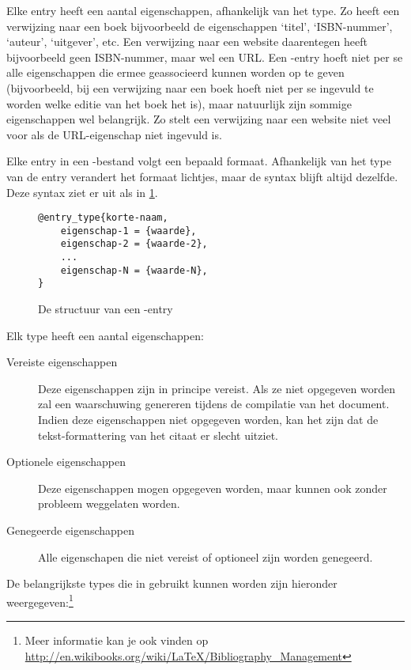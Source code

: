 \documentclass[12pt, dutch]{article}
\begin{document}
Elke entry heeft een aantal eigenschappen, afhankelijk van
het type. Zo heeft een verwijzing naar een boek bijvoorbeeld de
eigenschappen `titel', `ISBN-nummer', `auteur', `uitgever', etc. Een
verwijzing naar een website daarentegen heeft bijvoorbeeld geen
ISBN-nummer, maar wel een URL. Een \BibTeX-entry hoeft niet per se
alle eigenschappen die ermee geassocieerd kunnen worden op te geven
(bijvoorbeeld, bij een verwijzing naar een boek hoeft niet per se
ingevuld te worden welke editie van het boek het is), maar
natuurlijk zijn sommige eigenschappen wel belangrijk. Zo stelt een
verwijzing naar een website niet veel voor als de URL-eigenschap
niet ingevuld is.

Elke entry in een \BibTeX-bestand volgt een bepaald formaat.
Afhankelijk van het type van de entry verandert het formaat lichtjes,
maar de syntax blijft altijd dezelfde. Deze syntax ziet er uit als in
\cref{fig:bibtexstructure}.

\begin{figure}
  \begin{verbatim}
@entry_type{korte-naam,
    eigenschap-1 = {waarde},
    eigenschap-2 = {waarde-2},
    ...
    eigenschap-N = {waarde-N},
}
\end{verbatim}
  \caption{De structuur van een \BibTeX-entry}
  \label{fig:bibtexstructure}
\end{figure}

Elk type heeft een aantal eigenschappen:

\begin{description}
  \item[Vereiste eigenschappen] Deze eigenschappen zijn in principe
        vereist. Als ze niet opgegeven worden zal \BibTeX{} een waarschuwing
        genereren tijdens de compilatie van het document. Indien deze
        eigenschappen niet opgegeven worden, kan het zijn dat de
        tekst-formattering van het citaat er slecht uitziet.

  \item[Optionele eigenschappen] Deze eigenschappen mogen opgegeven
        worden, maar kunnen ook zonder probleem weggelaten worden.

  \item[Genegeerde eigenschappen] Alle eigenschapen die niet vereist
        of optioneel zijn worden genegeerd.
\end{description}

De belangrijkste types die in \BibTeX{} gebruikt kunnen worden zijn
hieronder weergegeven:\footnote{Meer informatie kan je ook vinden op \url{http://en.wikibooks.org/wiki/LaTeX/Bibliography_Management}}
\end{document}

